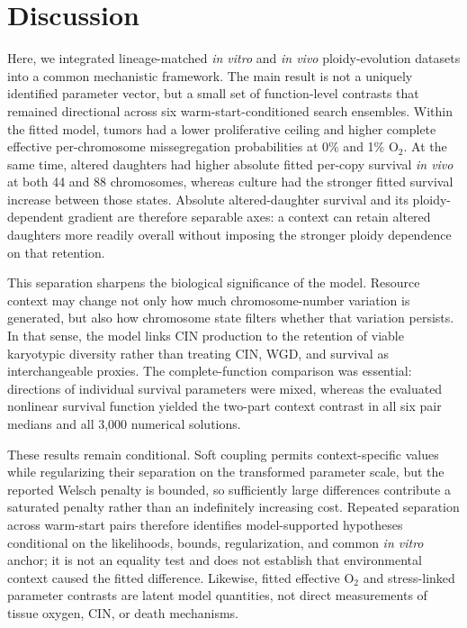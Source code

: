 \documentclass[11pt]{article}
\begin{document}
\clearpage
\section*{Discussion}

Here, we integrated lineage-matched \textit{in vitro} and \textit{in vivo} ploidy-evolution datasets into a common mechanistic framework. The main result is not a uniquely identified parameter vector, but a small set of function-level contrasts that remained directional across six warm-start-conditioned search ensembles. Within the fitted model, tumors had a lower proliferative ceiling and higher complete effective per-chromosome missegregation probabilities at 0\% and 1\% O$_2$. At the same time, altered daughters had higher absolute fitted per-copy survival \textit{in vivo} at both 44 and 88 chromosomes, whereas culture had the stronger fitted survival increase between those states. Absolute altered-daughter survival and its ploidy-dependent gradient are therefore separable axes: a context can retain altered daughters more readily overall without imposing the stronger ploidy dependence on that retention.

This separation sharpens the biological significance of the model. Resource context may change not only how much chromosome-number variation is generated, but also how chromosome state filters whether that variation persists. In that sense, the model links CIN production to the retention of viable karyotypic diversity rather than treating CIN, WGD, and survival as interchangeable proxies. The complete-function comparison was essential: directions of individual survival parameters were mixed, whereas the evaluated nonlinear survival function yielded the two-part context contrast in all six pair medians and all 3,000 numerical solutions.

These results remain conditional. Soft coupling permits context-specific values while regularizing their separation on the transformed parameter scale, but the reported Welsch penalty is bounded, so sufficiently large differences contribute a saturated penalty rather than an indefinitely increasing cost. Repeated separation across warm-start pairs therefore identifies model-supported hypotheses conditional on the likelihoods, bounds, regularization, and common \textit{in vitro} anchor; it is not an equality test and does not establish that environmental context caused the fitted difference. Likewise, fitted effective O$_2$ and stress-linked parameter contrasts are latent model quantities, not direct measurements of tissue oxygen, CIN, or death mechanisms.
\end{document}
